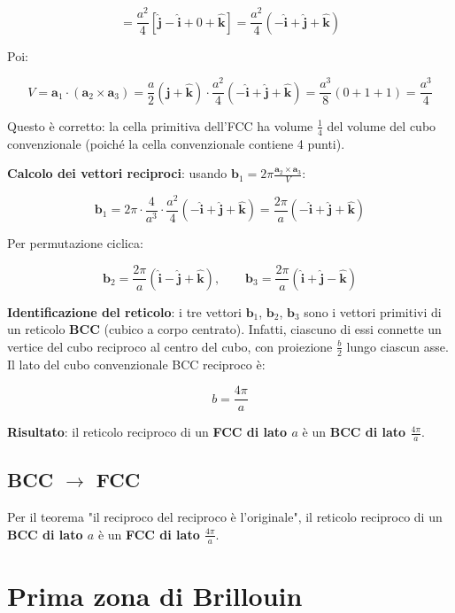 $$= \frac{a^2}{4}\left[\hat{\mathbf{j}} - \hat{\mathbf{i}} + 0 + \hat{\mathbf{k}}\right] = \frac{a^2}{4}(-\hat{\mathbf{i}} + \hat{\mathbf{j}} + \hat{\mathbf{k}})$$

Poi:

$$V = \mathbf{a}_1 \cdot (\mathbf{a}_2 \times \mathbf{a}_3) = \frac{a}{2}(\hat{\mathbf{j}} + \hat{\mathbf{k}}) \cdot \frac{a^2}{4}(-\hat{\mathbf{i}} + \hat{\mathbf{j}} + \hat{\mathbf{k}}) = \frac{a^3}{8}(0 + 1 + 1) = \frac{a^3}{4}$$

Questo è corretto: la cella primitiva dell'FCC ha volume \textbf{$\frac{1}{4}$} del volume del cubo convenzionale (poiché la cella convenzionale contiene 4 punti).

\textbf{Calcolo dei vettori reciproci}: usando $\mathbf{b}_1 = 2\pi \frac{\mathbf{a}_2 \times \mathbf{a}_3}{V}$:

$$\mathbf{b}_1 = 2\pi \cdot \frac{4}{a^3} \cdot \frac{a^2}{4}(-\hat{\mathbf{i}} + \hat{\mathbf{j}} + \hat{\mathbf{k}}) = \frac{2\pi}{a}(-\hat{\mathbf{i}} + \hat{\mathbf{j}} + \hat{\mathbf{k}})$$

Per permutazione ciclica:

$$\mathbf{b}_2 = \frac{2\pi}{a}(\hat{\mathbf{i}} - \hat{\mathbf{j}} + \hat{\mathbf{k}}), \qquad \mathbf{b}_3 = \frac{2\pi}{a}(\hat{\mathbf{i}} + \hat{\mathbf{j}} - \hat{\mathbf{k}})$$

\textbf{Identificazione del reticolo}: i tre vettori $\mathbf{b}_1$, $\mathbf{b}_2$, $\mathbf{b}_3$ sono i vettori primitivi di un reticolo \textbf{BCC} (cubico a corpo centrato). Infatti, ciascuno di essi connette un vertice del cubo reciproco al centro del cubo, con proiezione $\frac{b}{2}$ lungo ciascun asse. Il lato del cubo convenzionale BCC reciproco è:

$$b = \frac{4\pi}{a}$$

\textbf{Risultato}: il reticolo reciproco di un \textbf{FCC di lato $a$} è un \textbf{BCC di lato $\frac{4\pi}{a}$}.

\subsection*{BCC $\to$ FCC}

Per il teorema "il reciproco del reciproco è l'originale", il reticolo reciproco di un \textbf{BCC di lato $a$} è un \textbf{FCC di lato $\frac{4\pi}{a}$}.


\section{Prima zona di Brillouin}

